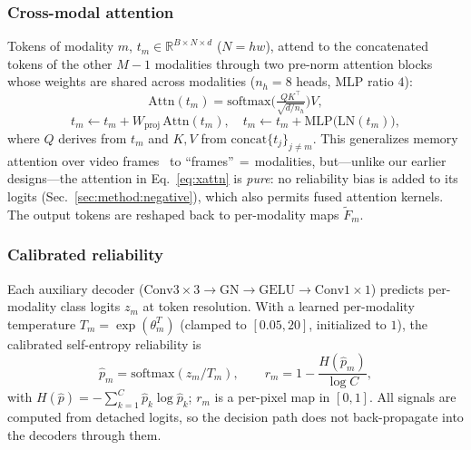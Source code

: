 \subsubsection{Cross-modal attention}
Tokens of modality $m$, $t_m\in\mathbb{R}^{B\times N\times d}$ ($N{=}hw$),
attend to the concatenated tokens of the other $M{-}1$ modalities through two
pre-norm attention blocks whose weights are shared across modalities
($n_h{=}8$ heads, MLP ratio $4$):
\begin{equation}
\mathrm{Attn}(t_m) = \mathrm{softmax}\!\Big(\tfrac{QK^{\top}}{\sqrt{d/n_h}}\Big)V,
\label{eq:xattn}
\end{equation}
\begin{equation}
t_m \leftarrow t_m + W_{\mathrm{proj}}\,\mathrm{Attn}(t_m),\quad
t_m \leftarrow t_m + \mathrm{MLP}\big(\mathrm{LN}(t_m)\big),
\end{equation}
where $Q$ derives from $t_m$ and $K,V$ from
$\mathrm{concat}\{t_j\}_{j\neq m}$. This generalizes memory
attention over video frames~\cite{sam2_2024,memorysam2025} to
``frames''\,$=$\,modalities, but---unlike our earlier
designs---the attention in Eq.~\eqref{eq:xattn} is \emph{pure}: no
reliability bias is added to its logits (Sec.~\ref{sec:method:negative}),
which also permits fused attention kernels. The output tokens are reshaped
back to per-modality maps $\tilde F_m$.

\subsubsection{Calibrated reliability}
Each auxiliary decoder ($\mathrm{Conv}3{\times}3\!\to\!\mathrm{GN}\!\to\!
\mathrm{GELU}\!\to\!\mathrm{Conv}1{\times}1$) predicts per-modality class
logits $z_m$ at token resolution. With a learned per-modality temperature
$T_m=\exp(\theta^{T}_m)$ (clamped to $[0.05,20]$, initialized to $1$), the
calibrated self-entropy reliability is
\begin{equation}
\hat p_m = \mathrm{softmax}(z_m/T_m),\qquad
r_m = 1-\frac{H(\hat p_m)}{\log C},
\label{eq:relcal}
\end{equation}
with $H(\hat p)=-\sum_{k=1}^{C}\hat p_k\log\hat p_k$; $r_m$ is a per-pixel
map in $[0,1]$. All signals are computed from detached logits, so the
decision path does not back-propagate into the decoders through them.

